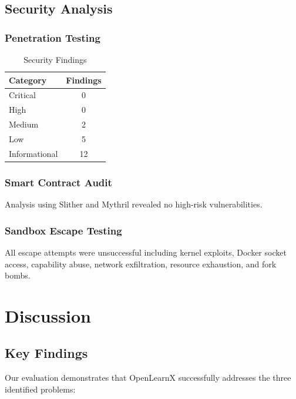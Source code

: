 \documentclass[conference]{IEEEtran}
\begin{document}
\subsection{Security Analysis}

\subsubsection{Penetration Testing}

\begin{table}[htbp]
\caption{Security Findings}
\begin{center}
\begin{tabular}{|l|c|}
\hline
\textbf{Category} & \textbf{Findings} \\
\hline
Critical & 0 \\
\hline
High & 0 \\
\hline
Medium & 2 \\
\hline
Low & 5 \\
\hline
Informational & 12 \\
\hline
\end{tabular}
\label{tab:security}
\end{center}
\end{table}

\subsubsection{Smart Contract Audit}

Analysis using Slither and Mythril revealed no high-risk vulnerabilities.

\subsubsection{Sandbox Escape Testing}

All escape attempts were unsuccessful including kernel exploits, Docker socket access, capability abuse, network exfiltration, resource exhaustion, and fork bombs.

\section{Discussion}

\subsection{Key Findings}

Our evaluation demonstrates that OpenLearnX successfully addresses the three identified problems:
\end{document}
